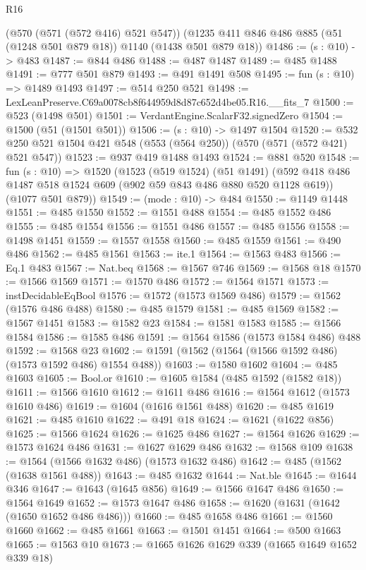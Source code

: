 \begin{lexlean}{R16}
\begin{coremodule}
    (@570 (@571 (@572 @416) @521 @547))
    (@1235 @411 @846 @486 @885 (@51 (@1248 @501 @879 @18)) @1140 (@1438 @501 @879 @18))
@1486 := (s : @10) -> @483
@1487 := @844 @486
@1488 := @487 @1487
@1489 := @485 @1488
@1491 := @777 @501 @879
@1493 := @491 @1491 @508
@1495 := fun (s : @10) => @1489 @1493
@1497 := @514 @250 @521
@1498 := LexLeanPreserve.C69a0078cb8f644959d8d87c652d4be05.R16.__fits_7
@1500 := @523 (@1498 @501)
@1501 := VerdantEngine.ScalarF32.signedZero
@1504 := @1500 (@51 (@1501 @501))
@1506 := (s : @10) -> @1497 @1504
@1520 := @532 @250 @521 @1504 @421 @548 (@553 (@564 @250)) (@570 (@571 (@572 @421) @521 @547))
@1523 := @937 @419 @1488 @1493
@1524 := @881 @520
@1548 := fun (s : @10) =>
  @1520
    (@1523
      (@519 @1524)
      (@51 @1491)
      (@592 @418 @486 @1487 @518 @1524 @609 (@902 @59 @843 @486 @880 @520 @1128 @619))
      (@1077 @501 @879))
@1549 := (mode : @10) -> @484
@1550 := @1149 @1448
@1551 := @485 @1550
@1552 := @1551 @488
@1554 := @485 @1552 @486
@1555 := @485 @1554
@1556 := @1551 @486
@1557 := @485 @1556
@1558 := @1498 @1451
@1559 := @1557 @1558
@1560 := @485 @1559
@1561 := @490 @486
@1562 := @485 @1561
@1563 := ite.{1}
@1564 := @1563 @483
@1566 := Eq.{1} @483
@1567 := Nat.beq
@1568 := @1567 @746
@1569 := @1568 @18
@1570 := @1566 @1569
@1571 := @1570 @486
@1572 := @1564 @1571
@1573 := instDecidableEqBool
@1576 := @1572 (@1573 @1569 @486)
@1579 := @1562 (@1576 @486 @488)
@1580 := @485 @1579
@1581 := @485 @1569
@1582 := @1567 @1451
@1583 := @1582 @23
@1584 := @1581 @1583
@1585 := @1566 @1584
@1586 := @1585 @486
@1591 := @1564 @1586 (@1573 @1584 @486) @488
@1592 := @1568 @23
@1602 := @1591 (@1562 (@1564 (@1566 @1592 @486) (@1573 @1592 @486) @1554 @488))
@1603 := @1580 @1602
@1604 := @485 @1603
@1605 := Bool.or
@1610 := @1605 @1584 (@485 @1592 (@1582 @18))
@1611 := @1566 @1610
@1612 := @1611 @486
@1616 := @1564 @1612 (@1573 @1610 @486)
@1619 := @1604 (@1616 @1561 @488)
@1620 := @485 @1619
@1621 := @485 @1610
@1622 := @491 @18
@1624 := @1621 (@1622 @856)
@1625 := @1566 @1624
@1626 := @1625 @486
@1627 := @1564 @1626
@1629 := @1573 @1624 @486
@1631 := @1627 @1629 @486
@1632 := @1568 @109
@1638 := @1564 (@1566 @1632 @486) (@1573 @1632 @486)
@1642 := @485 (@1562 (@1638 @1561 @488))
@1643 := @485 @1632
@1644 := Nat.ble
@1645 := @1644 @346
@1647 := @1643 (@1645 @856)
@1649 := @1566 @1647 @486
@1650 := @1564 @1649
@1652 := @1573 @1647 @486
@1658 := @1620 (@1631 (@1642 (@1650 @1652 @486 @486)))
@1660 := @485 @1658 @486
@1661 := @1560 @1660
@1662 := @485 @1661
@1663 := @1501 @1451
@1664 := @500 @1663
@1665 := @1563 @10
@1673 := @1665 @1626 @1629 @339 (@1665 @1649 @1652 @339 @18)

\end{coremodule}
\end{lexlean}
